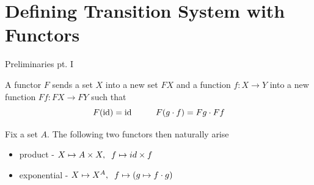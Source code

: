 \documentclass[aspectratio=169]{beamer}
\begin{document}
\section{Defining Transition System with Functors}

\begin{frame}{Preliminaries pt. I}


  \begin{definition}[Functor]
    A functor $F$ sends a set $X$ into a new set $FX$ and a function
    $f : X \to Y$ into a new function $F f : F X \to F Y$ such that
    \[
      F (\mathrm{id}) = \mathrm{id}  \hspace{1cm} F(g \cdot f) = F g \cdot F f
    \]
  \end{definition}

  Fix a set $A$. The following two functors then naturally arise
  \begin{itemize}
  \item product - $X \mapsto A \times X, \hspace{0.2cm} f \mapsto id \times f$
  \item exponential - $X \mapsto X^A, \hspace{0.2cm} f \mapsto (g \mapsto f \cdot g)$
  \end{itemize}
\end{frame}
\end{document}

